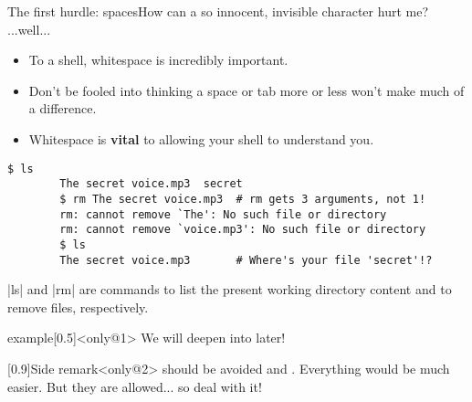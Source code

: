 \begin{frame}[fragile]{The first hurdle: spaces}{How can a so innocent, invisible character hurt me? ...well...}
    \vspace{-3mm}
    \begin{itemize}
        \item To a shell, whitespace is incredibly important.
        \item Don't be fooled into thinking a space or tab more or less won't make much of a difference.
        \item  Whitespace is \textbf{vital} to allowing your shell to understand you. 
    \end{itemize}
    \begin{lstlisting}[style=MyBash, aboveskip=4mm]
        $ ls
        The secret voice.mp3  secret
        $ rm The secret voice.mp3  # rm gets 3 arguments, not 1!
        rm: cannot remove `The': No such file or directory
        rm: cannot remove `voice.mp3': No such file or directory
        $ ls
        The secret voice.mp3       # Where's your file 'secret'!?
    \end{lstlisting}
    \centerline{\ssmall \bash|ls| and \bash|rm| are commands to list the present working directory content and to remove files, respectively.}
    \vspace{-2mm}
    \begin{overlayarea}{\textwidth}{0.3\textheight}
        \begin{varblock}{example}[0.5\textwidth]{}<only@1>
            We will deepen into  later!
        \end{varblock}
        \begin{varblock}{}[0.9\textwidth]{Side remark}<only@2>
             should be avoided and . Everything would be much easier. But they are allowed... so deal with it!
        \end{varblock}
    \end{overlayarea}
\end{frame}
